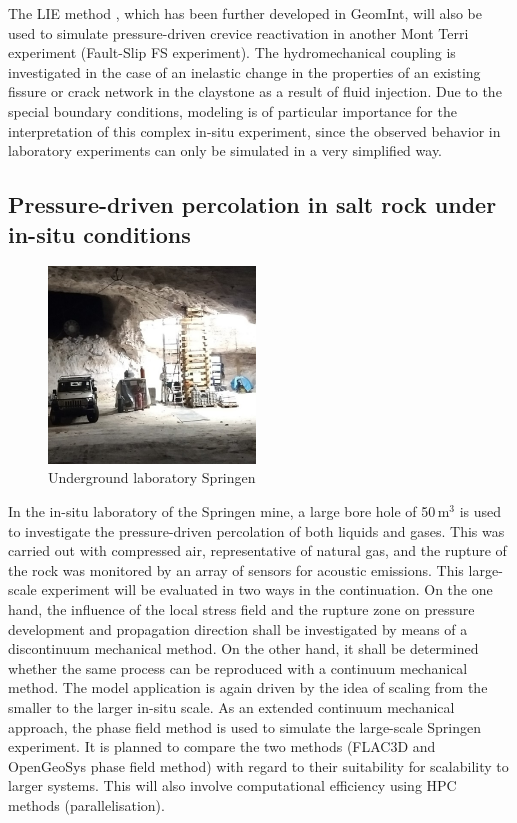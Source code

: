 The LIE method \cite{Vowinckel2020}, which has been further developed in GeomInt, will also be used to simulate pressure-driven crevice reactivation in another Mont Terri experiment (Fault-Slip FS experiment). The hydromechanical coupling is investigated in the case of an inelastic change in the properties of an existing fissure or crack network in the claystone as a result of fluid injection. Due to the special boundary conditions, modeling is of particular importance for the interpretation of this complex in-situ experiment, since the observed behavior in laboratory experiments can only be simulated in a very simplified way.

\subsection{Pressure-driven percolation in salt rock under in-situ conditions}

\begin{figure}
\vspace{-5mm}
\includegraphics[width=0.49\textwidth]{figures/Versuch-Photo.png}
\caption{Underground laboratory Springen}
\end{figure}
In the in-situ laboratory of the Springen mine, a large bore hole of 50\,m$^3$ is used to investigate the pressure-driven percolation of both liquids and gases. This was carried out with compressed air, representative of natural gas, and the rupture of the rock was monitored by an array of sensors for acoustic emissions. This large-scale experiment will be evaluated in two ways in the continuation. On the one hand, the influence of the local stress field and the rupture zone on pressure development and propagation direction shall be investigated by means of a discontinuum mechanical method. On the other hand, it shall be determined whether the same process can be reproduced with a continuum mechanical method. The model application is again driven by the idea of scaling from the smaller to the larger in-situ scale.
As an extended continuum mechanical approach, the phase field method is used to simulate the large-scale Springen experiment. 
%
It is planned to compare the two methods (FLAC3D and OpenGeoSys phase field method) with regard to their suitability for scalability to larger systems. This will also involve computational efficiency using HPC methods (parallelisation).

